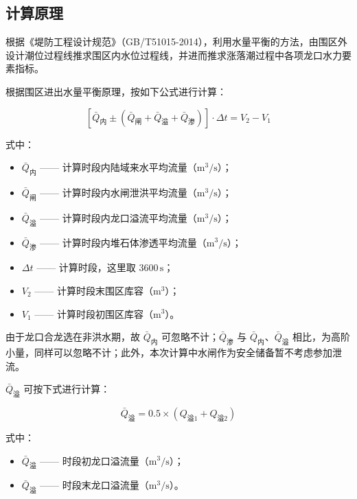 \documentclass[UTF8, a4paper, 12pt]{ctexart} %
\begin{document}
\newpage
\subsection{计算原理}
根据《堤防工程设计规范》（GB/T51015-2014），利用水量平衡的方法，由围区外设计潮位过程线推求围区内水位过程线，并进而推求涨落潮过程中各项龙口水力要素指标。

根据围区进出水量平衡原理，按如下公式进行计算：

\begin{equation}
    \left[ \bar{Q}_{\text{内}} \pm \left( \bar{Q}_{\text{闸}} + \bar{Q}_{\text{溢}} + \bar{Q}_{\text{渗}} \right) \right] \cdot \Delta t = V_2 - V_1 
\end{equation}

式中：
\begin{itemize}
    \item $\bar{Q}_{\text{内}}$ —— 计算时段内陆域来水平均流量（$\text{m}^3/\text{s}$）；
    \item $\bar{Q}_{\text{闸}}$ —— 计算时段内水闸泄洪平均流量（$\text{m}^3/\text{s}$）；
    \item $\bar{Q}_{\text{溢}}$ —— 计算时段内龙口溢流平均流量（$\text{m}^3/\text{s}$）；
    \item $\bar{Q}_{\text{渗}}$ —— 计算时段内堆石体渗透平均流量（$\text{m}^3/\text{s}$）；
    \item $\Delta t$ —— 计算时段，这里取 $3600\,\text{s}$；
    \item $V_2$ —— 计算时段末围区库容（$\text{m}^3$）；
    \item $V_1$ —— 计算时段初围区库容（$\text{m}^3$）。
\end{itemize}

由于龙口合龙选在非洪水期，故 $\bar{Q}_{\text{内}}$ 可忽略不计；$\bar{Q}_{\text{渗}}$ 与 $\bar{Q}_{\text{内}}$、$\bar{Q}_{\text{溢}}$ 相比，为高阶小量，同样可以忽略不计；此外，本次计算中水闸作为安全储备暂不考虑参加泄流。

$\bar{Q}_{\text{溢}}$ 可按下式进行计算：

\begin{equation}
    \bar{Q}_{\text{溢}} = 0.5 \times (Q_{\text{溢1}} + Q_{\text{溢2}}) 
\end{equation}

式中：
\begin{itemize}
    \item $\bar{Q}_{\text{溢}}$ —— 时段初龙口溢流量（$\text{m}^3/\text{s}$）；
    \item $\bar{Q}_{\text{溢}}$ —— 时段末龙口溢流量（$\text{m}^3/\text{s}$）。
\end{itemize}
\end{document}

